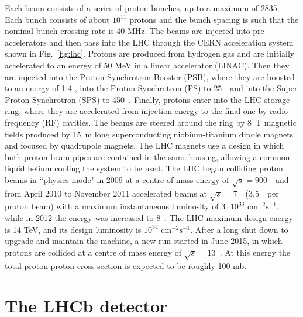 Each beam consists of a series of proton bunches, up to a maximum of 2835. Each bunch consists of about $10^{11}$
protons and the bunch spacing is such that the nominal bunch crossing rate is 40 MHz. The beams are injected into
pre-accelerators and then pass into the LHC through the CERN acceleration system shown in Fig.~\ref{fig:lhc}. Protons are
produced from hydrogen gas and are initially accelerated to an energy of 50 MeV in a linear accelerator (LINAC).
Then they are injected into the Proton Synchrotron Booster (PSB), where they are boosted to an energy of 1.4 \gev,
into the Proton Synchrotron (PS) to 25~\gev~and into the Super Proton Synchrotron (SPS) to 450~\gev. Finally, protons
enter into the LHC storage ring, where they are accelerated from injection energy to the final one
by radio frequency (RF) cavities. The beams are steered around the ring by 8~T magnetic fields produced by 15~m long
superconducting niobium-titanium dipole magnets and focused by quadrupole magnets. The LHC magnets
use a design in which both proton beam pipes are contained in the same housing, allowing a common liquid helium cooling
the system to be used. The LHC began colliding proton beams in ``physics mode" in 2009 at a centre of mass
energy of $\sqrt{s} = 900$~\gev~and from April 2010 to November 2011 accelerated beams at $\sqrt{s} = 7$~\tev~(3.5~\tev~per
proton beam) with a maximum instantaneous luminosity of $3\cdot10^{33} \text{ cm}^{-2}\text{s}^{-1}$, while in
2012 the energy was increased to 8~\tev. The LHC maximum design energy is 14 TeV, and its design
luminosity is $10^{34} \text{ cm}^{-2}\text{s}^{-1}$. After a long shut down to upgrade and maintain the machine, a
new run started in June 2015, in which protons are collided at a centre of mass energy of $\sqrt{s} = 13$~\tev. At this
energy the total proton-proton cross-section is expected to be roughly 100 mb.

\section{The LHCb detector}


